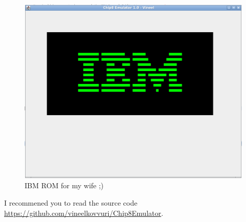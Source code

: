 \documentclass{article}
\begin{document}
\begin{figure}[H]
\centering
\includegraphics[width=\textwidth]{6.Emulator.png}
\caption{IBM ROM for my wife ;)}
\end{figure}
I recommened you to read the source code \url{https://github.com/vineelkovvuri/Chip8Emulator}.
\end{document}
